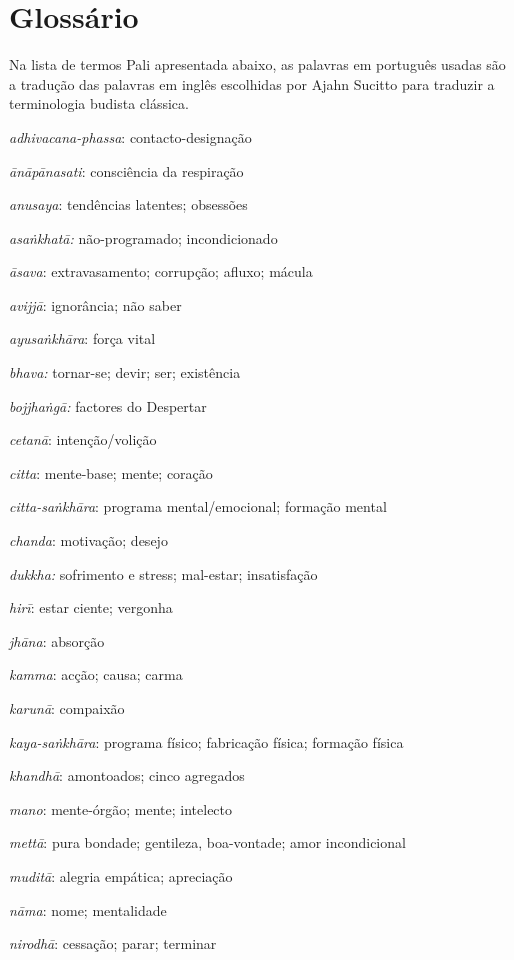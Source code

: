 {  \section{Glossário}\label{glossuxe1rio}

  Na lista de termos Pali apresentada abaixo, as palavras em português usadas são a tradução das palavras em inglês escolhidas por Ajahn Sucitto para traduzir a terminologia budista clássica.

  \emph{adhivacana-phassa}: contacto-designação

  \emph{ānāpānasati}: consciência da respiração

  \emph{anusaya}: tendências latentes; obsessões

  \emph{asaṅkhatā:} não-programado; incondicionado

  \emph{āsava}: extravasamento; corrupção; afluxo; mácula

  \emph{avijjā}: ignorância; não saber

  \emph{ayusaṅkhāra}: força vital

  \emph{bhava:} tornar-se; devir; ser; existência

  \emph{bojjhaṅgā:} factores do Despertar

  \emph{cetanā}: intenção/volição

  \emph{citta}: mente-base; mente; coração

  \emph{citta-saṅkhāra}: programa mental/emocional; formação mental

  \emph{chanda}: motivação; desejo

  \emph{dukkha:} sofrimento e stress; mal-estar; insatisfação

  \emph{hirī}: estar ciente; vergonha

  \emph{jhāna}: absorção

  \emph{kamma}: acção; causa; carma

  \emph{karunā}: compaixão

  \emph{kaya-saṅkhāra}: programa físico; fabricação física; formação física

  \emph{khandhā}: amontoados; cinco agregados

  \emph{mano}: mente-órgão; mente; intelecto

  \emph{mettā}: pura bondade; gentileza, boa-vontade; amor incondicional

  \emph{muditā}: alegria empática; apreciação

  \emph{nāma}: nome; mentalidade

  \emph{nirodhā}: cessação; parar; terminar

}
